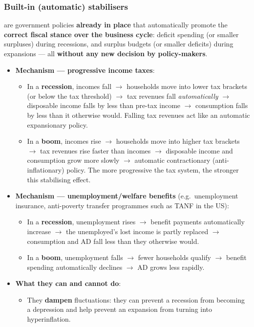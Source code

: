 \subsubsection*{Built-in (automatic) stabilisers}
 are government policies \textbf{already in place} that automatically promote the \textbf{correct fiscal stance over the business cycle}: deficit spending (or smaller surpluses) during recessions, and surplus budgets (or smaller deficits) during expansions --- all \textbf{without any new decision by policy-makers}.
\begin{itemize}
  \item \textbf{Mechanism --- progressive income taxes}:
  \begin{itemize}
    \item In a \textbf{recession}, incomes fall $\to$ households move into lower tax brackets (or below the tax threshold) $\to$ tax revenues fall \textit{automatically} $\to$ disposable income falls by less than pre-tax income $\to$ consumption falls by less than it otherwise would. Falling tax revenues act like an automatic expansionary policy.
    \item In a \textbf{boom}, incomes rise $\to$ households move into higher tax brackets $\to$ tax revenues rise faster than incomes $\to$ disposable income and consumption grow more slowly $\to$ automatic contractionary (anti-inflationary) policy. The more progressive the tax system, the stronger this stabilising effect.
  \end{itemize}
  \item \textbf{Mechanism --- unemployment/welfare benefits} (e.g.\ unemployment insurance, anti-poverty transfer programmes such as TANF in the US):
  \begin{itemize}
    \item In a \textbf{recession}, unemployment rises $\to$ benefit payments automatically increase $\to$ the unemployed's lost income is partly replaced $\to$ consumption and AD fall less than they otherwise would.
    \item In a \textbf{boom}, unemployment falls $\to$ fewer households qualify $\to$ benefit spending automatically declines $\to$ AD grows less rapidly.
  \end{itemize}
  \item \textbf{What they can and cannot do}:
  \begin{itemize}
    \item They \textbf{dampen} fluctuations: they can prevent a recession from becoming a depression and help prevent an expansion from turning into hyperinflation.

\end{itemize}
\end{itemize}
